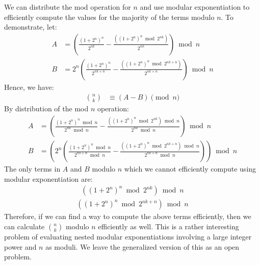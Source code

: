 \documentclass{article}
\theoremstyle{plain}
\theoremstyle{definition}
\begin{document}
We can distribute the mod operation for $n$ and use modular exponentiation to efficiently compute the values for the majority of the terms modulo $n$. To demonstrate, let:
\begin{align}
A &= \left(\frac{(1 + 2^{n})^{n}}{2^{nk}} - \frac{((1 + 2^{n})^{n} \bmod{2^{nk}})}{2^{nk}}\right) \bmod{n} \\
B &= 2^{n} \left( \frac{(1 + 2^{n})^{n}}{2^{nk+n}} - \frac{((1 + 2^{n})^{n} \bmod{2^{nk+n}})}{2^{nk+n}} \right) \bmod{n}
\end{align}
Hence, we have:
\begin{align}
\binom{n}{k} &\equiv (A - B) \pmod{n}
\end{align}
By distribution of the mod \( n \) operation:
\begin{align}
A &= \left(\frac{(1 + 2^{n})^{n} \bmod{n}}{2^{nk} \bmod{n}} - \frac{((1 + 2^{n})^{n} \bmod{2^{nk}}) \bmod{n}}{2^{nk} \bmod{n}}\right) \bmod{n} \\
B &= \left(2^{n} \left( \frac{(1 + 2^{n})^{n} \bmod{n}}{2^{nk+n} \bmod{n}} - \frac{((1 + 2^{n})^{n} \bmod{2^{nk+n}}) \bmod{n}}{2^{nk+n} \bmod{n}} \right)\right) \bmod{n}
\end{align}
The only terms in \( A \) and \( B \) modulo \( n \) which we cannot efficiently compute using modular exponentiation are:
\begin{align}
    \left((1 + 2^{n})^{n} \bmod{2^{nk}}\right) \bmod{n}
\end{align}
\begin{align}
    \left((1 + 2^{n})^{n} \bmod{2^{nk+n}}\right) \bmod{n}
\end{align}
Therefore, if we can find a way to compute the above terms efficiently, then we can calculate \( \binom{n}{k} \) modulo \( n \) efficiently as well. This is a rather interesting problem of evaluating nested modular exponentiations involving a large integer power and \( n \) as moduli. We leave the generalized version of this as an open problem.

\end{document}
